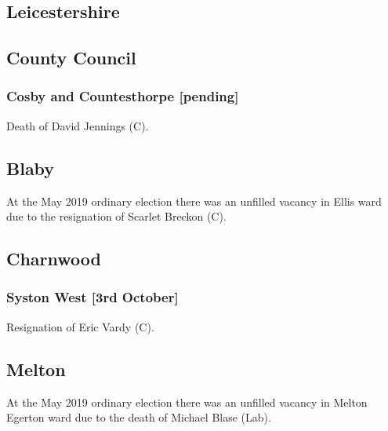 \documentclass[a4paper,openany]{book}
\begin{document}
\begin{resultsiii}
\section{Leicestershire}

\subsection*{County Council}

\subsubsection*{Cosby and Countesthorpe \hspace*{\fill}\nolinebreak[1]%
	\enspace\hspace*{\fill}
	[pending]}


Death of David Jennings (C).

\subsection*{Blaby}

At the May 2019 ordinary election there was an unfilled vacancy in Ellis ward due to the resignation of Scarlet Breckon (C).

\subsection*{Charnwood}

\subsubsection*{Syston West \hspace*{\fill}\nolinebreak[1]%
	\enspace\hspace*{\fill}
	[3rd October]}


Resignation of Eric Vardy (C).

\subsection*{Melton}

At the May 2019 ordinary election there was an unfilled vacancy in Melton Egerton ward due to the death of Michael Blase (Lab).


\end{resultsiii}
\end{document}
